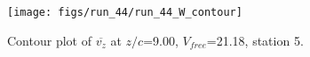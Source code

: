 \begin{figure}[H]
\centering
\texttt{[image: figs/run\_44/run\_44\_W\_contour]}
\caption{Contour plot of $\overline{v_{z}}$ at $z/c$=9.00, $V_{free}$=21.18, station 5.}
\label{fig:run_44_W_contour}
\end{figure}



